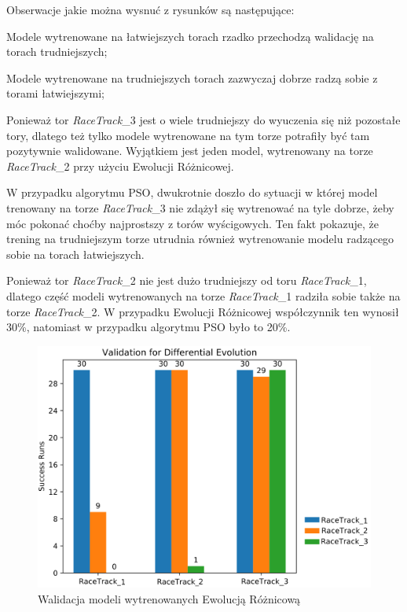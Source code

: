 Obserwacje jakie można wysnuć z rysunków są następujące:
\begin{enumerate*}
\item Modele wytrenowane na łatwiejszych torach rzadko przechodzą walidację na torach trudniejszych;
\item Modele wytrenowane na trudniejszych torach zazwyczaj dobrze radzą sobie z torami łatwiejszymi;
\item Ponieważ tor \textit{RaceTrack}\_3 jest o wiele trudniejszy do wyuczenia się niż pozostałe tory, dlatego też tylko modele wytrenowane na tym torze potrafiły być tam pozytywnie walidowane. Wyjątkiem jest jeden model, wytrenowany na torze \textit{RaceTrack}\_2 przy użyciu Ewolucji Różnicowej.
\item W przypadku algorytmu PSO, dwukrotnie doszło do sytuacji w której model trenowany na torze \textit{RaceTrack}\_3 nie zdążył się wytrenować na tyle dobrze, żeby móc pokonać choćby najprostszy z torów wyścigowych. Ten fakt pokazuje, że trening na trudniejszym torze utrudnia również wytrenowanie modelu radzącego sobie na torach łatwiejszych.
\item Ponieważ tor \textit{RaceTrack}\_2 nie jest dużo trudniejszy od toru \textit{RaceTrack}\_1, dlatego część modeli wytrenowanych na torze \textit{RaceTrack}\_1 radziła sobie także na torze \textit{RaceTrack}\_2. W przypadku Ewolucji Różnicowej współczynnik ten wynosił 30\%, natomiast w przypadku algorytmu PSO było to 20\%.
\end{enumerate*}
\vspace{0.5cm}
\begin{figure}[H]
\centering
\includegraphics[width=15cm]{resources/figures/validation_de.png}
\caption{Walidacja modeli wytrenowanych Ewolucją Różnicową}
\label{ValidationDE}
\end{figure}

